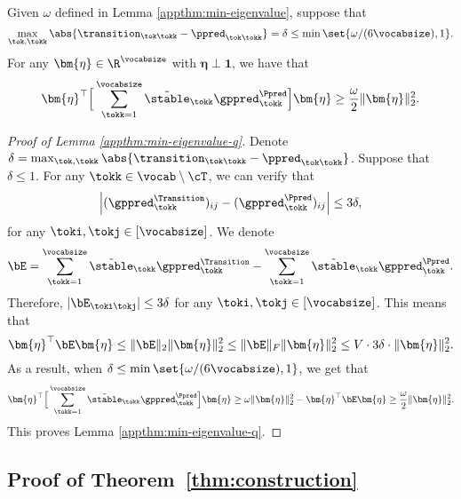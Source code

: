 \begin{lemma}\label{appthm:min-eigenvalue-q}
Given $\omega$ defined in Lemma \ref{appthm:min-eigenvalue}, 
suppose that 
\begin{equation}\label{appeqn:error-q}
\max_{\tok,\tokk} \abs{\transition_{\tok\tokk}-\ppred_{\tok\tokk}} = \delta \leq \min\set{\omega/(6\vocabsize), 1}.
\end{equation}
For any $\bm{\eta} \in \R^\vocabsize$ with $\bm{\eta} \perp \bm{1}$, we have that
\[
\bm{\eta}^\top \Big[ \sum_{\tokk=1}^\vocabsize \Tilde{\stable}_\tokk \gppred_{\tokk}^{\Ppred} \Big] \bm{\eta} \geq \frac{\omega}{2} \|\bm{\eta}\|_2^2.
\]
\end{lemma}
\begin{proof}[Proof of Lemma \ref{appthm:min-eigenvalue-q}]
Denote $\delta = \max_{\tok,\tokk} \abs{\transition_{\tok\tokk}-\ppred_{\tok\tokk}}$. Suppose that $\delta \leq 1$.
For any $\tokk\in \vocab\setminus\cT$, we can verify that
\[\Big|(\gppred_\tokk^\Transition)_{ij}-(\gppred_\tokk^\Ppred)_{ij} \Big|\leq 3 \delta,\]
for any $\toki,\tokj\in [\vocabsize]$.
We denote 
\[
\bE = \sum_{\tokk=1}^\vocabsize \Tilde{\stable}_{\tokk} \gppred_\tokk^\Transition - \sum_{\tokk=1}^\vocabsize \Tilde{\stable}_{\tokk} \gppred_\tokk^\Ppred.
\]
Therefore, $|\bE_{\toki\tokj}|\leq 3\delta$ for any $\toki,\tokj \in [\vocabsize]$.
This means that
\[
\bm{\eta}^\top \bE \bm{\eta} \leq \|\bE\|_2 \|\bm{\eta}\|_2^2 \leq \|\bE\|_{F} \|\bm{\eta}\|_2^2 \leq V\cdot 3\delta \cdot \|\bm{\eta}\|_2^2.
\]
As a result, when $\delta \leq \min\set{\omega/(6\vocabsize), 1}$, we get that
\[
\bm{\eta}^\top \Big[ \sum_{\tokk=1}^\vocabsize \Tilde{\stable}_\tokk \gppred_{\tokk}^{\Ppred} \Big] \bm{\eta} \geq \omega \|\bm{\eta}\|_2^2 - \bm{\eta}^\top \bE \bm{\eta} \geq \frac{\omega}{2} \|\bm{\eta}\|_2^2.
\]
This proves Lemma \ref{appthm:min-eigenvalue-q}.
\end{proof}

\subsection{Proof of Theorem~\ref{thm:construction}}\label{app:proof-construction}



